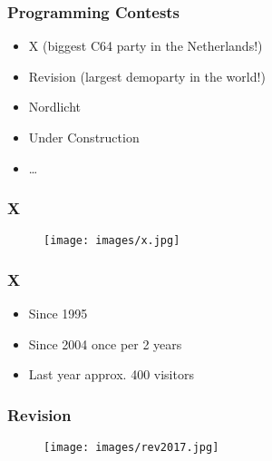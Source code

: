 \documentclass[aspectratio=43]{uva-inf-presentation}
\begin{document}




\begin{frame}
\frametitle{Programming Contests}

\begin{itemize}
\item X (biggest C64 party in the Netherlands!)
\item Revision (largest demoparty in the world!)
\item Nordlicht
\item Under Construction
\item \dots
\end{itemize}

\end{frame}


\begin{frame}
\frametitle{X}

\begin{figure}
\texttt{[image: images/x.jpg]}
\end{figure}

\end{frame}


\begin{frame}
\frametitle{X}

\begin{itemize}
\item Since 1995
\item Since 2004 once per 2 years
\item Last year approx. 400 visitors
\end{itemize}

\end{frame}


\begin{frame}
\frametitle{Revision}

\begin{figure}
\texttt{[image: images/rev2017.jpg]}
\end{figure}

\end{frame}
\end{document}
